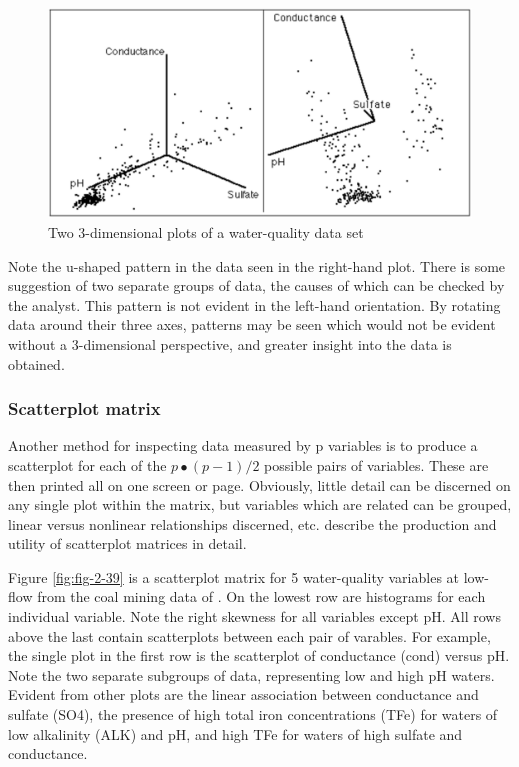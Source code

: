 \documentclass[]{book}
\begin{document}
\begin{figure}

{\centering \includegraphics[width=16.21in]{figures/2_38} 

}

\caption{Two 3-dimensional plots of a water-quality data set}\label{fig:fig-2-38}
\end{figure}

Note the u-shaped pattern in the data seen in the right-hand plot. There is some suggestion of two separate groups of data, the causes of which can be checked by the analyst. This pattern is not evident in the left-hand orientation. By rotating data around their three axes, patterns may be seen which would not be evident without a 3-dimensional perspective, and greater insight into the data is obtained.

\hypertarget{scatterplot-matrix}{%
\subsubsection{Scatterplot matrix}\label{scatterplot-matrix}}

Another method for inspecting data measured by p variables is to produce a scatterplot for each of the \(p \bullet (p − 1) / 2\) possible pairs of variables. These are then printed all on one screen or page. Obviously, little detail can be discerned on any single plot within the matrix, but variables which are related can be grouped, linear versus nonlinear relationships discerned, etc. \citet{chambers_graphical_1983} describe the production and utility of scatterplot matrices in detail.

Figure \ref{fig:fig-2-39} is a scatterplot matrix for 5 water-quality variables at low-flow from the coal mining data of \citet{helsel_mine_1983}. On the lowest row are histograms for each individual variable. Note the right skewness for all variables except pH. All rows above the last contain scatterplots between each pair of varables. For example, the single plot in the first row is the scatterplot of conductance (cond) versus pH. Note the two separate subgroups of data, representing low and high pH waters. Evident from other plots are the linear association between conductance and sulfate (SO4), the presence of high total iron concentrations (TFe) for waters of low alkalinity (ALK) and pH, and high TFe for waters of high sulfate and conductance.
\end{document}
